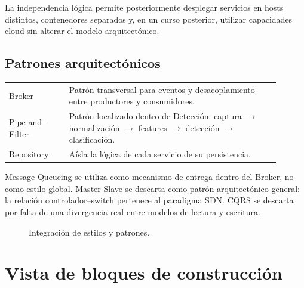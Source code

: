 \documentclass[11pt,a4paper]{article}
\begin{document}
La independencia lógica permite posteriormente desplegar servicios en hosts distintos, contenedores separados y, en un curso posterior, utilizar capacidades cloud sin alterar el modelo arquitectónico.

\subsection{Patrones arquitectónicos}

\begin{longtable}{p{0.2\linewidth}p{0.7\linewidth}}
\toprule
Broker & Patrón transversal para eventos y desacoplamiento entre productores y consumidores.\\
Pipe-and-Filter & Patrón localizado dentro de Detección: captura \(\rightarrow\) normalización \(\rightarrow\) features \(\rightarrow\) detección \(\rightarrow\) clasificación.\\
Repository & Aísla la lógica de cada servicio de su persistencia.\\
\bottomrule
\end{longtable}

Message Queueing se utiliza como mecanismo de entrega dentro del Broker, no como estilo global. Master-Slave se descarta como patrón arquitectónico general: la relación controlador--switch pertenece al paradigma SDN. CQRS se descarta por falta de una divergencia real entre modelos de lectura y escritura.

\begin{figure}[H]
\centering
{}
\caption{Integración de estilos y patrones.}
\end{figure}

\section{Vista de bloques de construcción}
\end{document}
